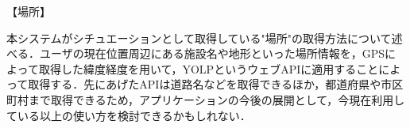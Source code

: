 【場所】
\par
本システムがシチュエーションとして取得している"場所"の取得方法について述べる．ユーザの現在位置周辺にある施設名や地形といった場所情報を，GPSによって取得した緯度経度を用いて，YOLPというウェブAPIに適用することによって取得する．先にあげたAPIは道路名などを取得できるほか，都道府県や市区町村まで取得できるため，アプリケーションの今後の展開として，今現在利用している以上の使い方を検討できるかもしれない．
